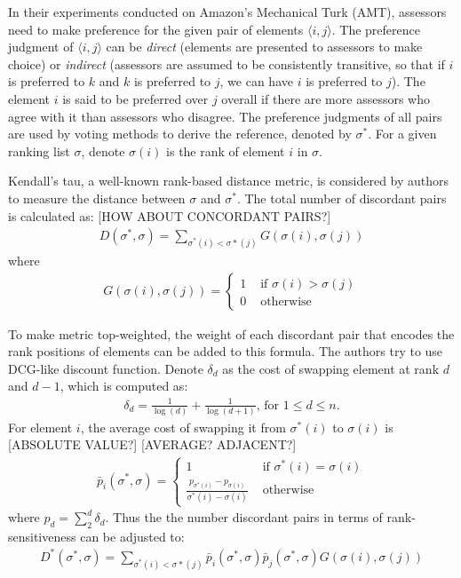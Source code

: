 \documentclass{article}
\begin{document}
In their experiments conducted on Amazon's Mechanical Turk (AMT), assessors need to make preference for the given pair of elements $\langle i, j \rangle$. The preference judgment of $\langle i, j \rangle$ can be \textit{direct} (elements are presented to assessors to make choice) or \textit{indirect} (assessors are assumed to be consistently transitive, so that if $i$ is preferred to $k$ and $k$ is preferred to $j$, we can have $i$ is preferred to $j$). The element $i$ is said to be preferred over $j$ overall if there are more assessors who agree with it than assessors who disagree. The preference judgments of all pairs are used by voting methods to derive the reference, denoted by $\sigma^*$. For a given ranking list $\sigma$, denote $\sigma(i)$ is the rank of element $i$ in $\sigma$.

Kendall's tau, a well-known rank-based distance metric, is considered by authors to measure the distance between $\sigma$ and $\sigma^*$. The total number of discordant pairs is calculated as: [HOW ABOUT CONCORDANT PAIRS?]
\begin{align*}
D(\sigma^*, \sigma) = \sum_{\sigma^*(i) < \sigma*(j)} G(\sigma(i), \sigma(j))
\end{align*}
where
\begin{align*}
G(\sigma(i), \sigma(j)) = \begin{cases} 1 &\text{ if } \sigma(i) > \sigma(j)\\0 &\text{ otherwise} \end{cases}
\end{align*}

To make metric top-weighted, the weight of each discordant pair that encodes the rank positions of elements can be added to this formula. The authors try to use DCG-like discount function. Denote $\delta_d$ as the cost of swapping element at rank $d$ and $d-1$, which is computed as:
\begin{align*}
\delta_d = \frac{1}{\log(d)}+\frac{1}{\log(d+1)}\text{, for } 1\leq d \leq n.
\end{align*}
For element $i$, the average cost of swapping it from $\sigma^*(i)$ to $\sigma(i)$ is [ABSOLUTE VALUE?] [AVERAGE? ADJACENT?]
\begin{align*}
\bar{p}_i(\sigma^*, \sigma) = \begin{cases} 1 								&\text{ if } \sigma^*(i) = \sigma(i)\\
										\frac{p_{\sigma^*(i)} - p_{\sigma(i)}}{\sigma^*(i) - \sigma(i)} &\text{ otherwise} \end{cases}
\end{align*}
where $p_d = \sum_2^{d}\delta_d$. Thus the the number discordant pairs in terms of rank-sensitiveness can be adjusted to:
\begin{align*}
D^*(\sigma^*, \sigma) = \sum_{\sigma^*(i) < \sigma*(j)} \bar{p}_i(\sigma^*, \sigma) \bar{p}_j(\sigma^*, \sigma) G(\sigma(i), \sigma(j))
\end{align*}
\end{document}
